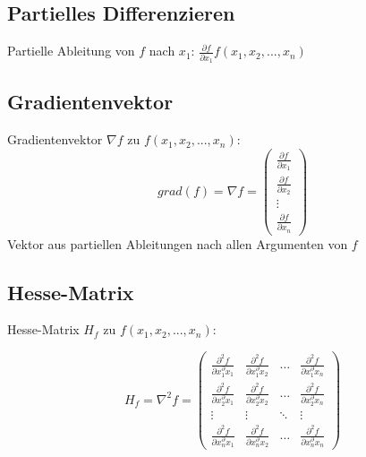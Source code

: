 \documentclass[a4paper,11pt]{article}
\begin{document}
	\subsection{Partielles Differenzieren} %
	\label{sub:partielles_differenzieren}

	Partielle Ableitung von $f$ nach $x_1$: $\frac{\partial f}{\partial x_1} f(x_1,x_2,...,x_n)$
	
	\subsection{Gradientenvektor} %
	\label{sub:gradientenvektor}
	Gradientenvektor $\nabla f$ zu $f(x_1,x_2,...,x_n)$: 
	\begin{equation}
		grad(f) = \nabla f = \left(\begin{array}{c} \frac{\partial f}{\partial x_1} \\ 
		\frac{\partial f}{\partial x_2} \\ \vdots \\ \frac{\partial f}{\partial x_n} \end{array}\right)
	\end{equation}
	Vektor aus partiellen Ableitungen nach allen Argumenten von $f$
	
	\subsection{Hesse-Matrix} %
	\label{sub:hesse_matrix}
	Hesse-Matrix $H_f$ zu $f(x_1,x_2,...,x_n)$: 
	
	\begin{equation}
		H_f = \nabla^2f = \left( \begin{array}{cccc}
			\frac{\partial^2 f}{\partial x_1^\partial x_1} & \frac{\partial^2 f}{\partial x_1^\partial x_2} 
			& \dots & \frac{\partial^2 f}{\partial x_1^\partial x_n} \\
			
			\frac{\partial^2 f}{\partial x_2^\partial x_1} & \frac{\partial^2 f}{\partial x_2^\partial x_2} 
			& \dots & \frac{\partial^2 f}{\partial x_2^\partial x_n} \\	
			\vdots & \vdots & \ddots & \vdots \\
			\frac{\partial^2 f}{\partial x_n^\partial x_1} & \frac{\partial^2 f}{\partial x_n^\partial x_2} 
			& \dots & \frac{\partial^2 f}{\partial x_n^\partial x_n}
		\end{array}\right)
	\end{equation}
	
\end{document}
